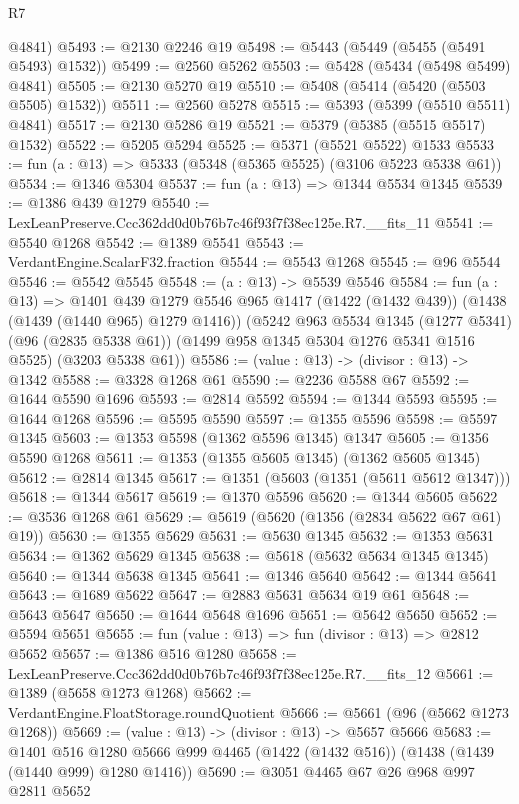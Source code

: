 \begin{lexlean}{R7}
\begin{coremodule}
      @4841)
@5493 := @2130 @2246 @19
@5498 := @5443 (@5449 (@5455 (@5491 @5493) @1532))
@5499 := @2560 @5262
@5503 := @5428 (@5434 (@5498 @5499) @4841)
@5505 := @2130 @5270 @19
@5510 := @5408 (@5414 (@5420 (@5503 @5505) @1532))
@5511 := @2560 @5278
@5515 := @5393 (@5399 (@5510 @5511) @4841)
@5517 := @2130 @5286 @19
@5521 := @5379 (@5385 (@5515 @5517) @1532)
@5522 := @5205 @5294
@5525 := @5371 (@5521 @5522) @1533
@5533 := fun (a : @13) => @5333 (@5348 (@5365 @5525) (@3106 @5223 @5338 @61))
@5534 := @1346 @5304
@5537 := fun (a : @13) => @1344 @5534 @1345
@5539 := @1386 @439 @1279
@5540 := LexLeanPreserve.Ccc362dd0d0b76b7c46f93f7f38ec125e.R7.__fits_11
@5541 := @5540 @1268
@5542 := @1389 @5541
@5543 := VerdantEngine.ScalarF32.fraction
@5544 := @5543 @1268
@5545 := @96 @5544
@5546 := @5542 @5545
@5548 := (a : @13) -> @5539 @5546
@5584 := fun (a : @13) =>
  @1401
    @439
    @1279
    @5546
    @965
    @1417
    (@1422 (@1432 @439))
    (@1438 (@1439 (@1440 @965) @1279 @1416))
    (@5242
      @963
      @5534
      @1345
      (@1277 @5341)
      (@96 (@2835 @5338 @61))
      (@1499 @958 @1345 @5304 @1276 @5341 @1516 @5525)
      (@3203 @5338 @61))
@5586 := (value : @13) -> (divisor : @13) -> @1342
@5588 := @3328 @1268 @61
@5590 := @2236 @5588 @67
@5592 := @1644 @5590 @1696
@5593 := @2814 @5592
@5594 := @1344 @5593
@5595 := @1644 @1268
@5596 := @5595 @5590
@5597 := @1355 @5596
@5598 := @5597 @1345
@5603 := @1353 @5598 (@1362 @5596 @1345) @1347
@5605 := @1356 @5590 @1268
@5611 := @1353 (@1355 @5605 @1345) (@1362 @5605 @1345)
@5612 := @2814 @1345
@5617 := @1351 (@5603 (@1351 (@5611 @5612 @1347)))
@5618 := @1344 @5617
@5619 := @1370 @5596
@5620 := @1344 @5605
@5622 := @3536 @1268 @61
@5629 := @5619 (@5620 (@1356 (@2834 @5622 @67 @61) @19))
@5630 := @1355 @5629
@5631 := @5630 @1345
@5632 := @1353 @5631
@5634 := @1362 @5629 @1345
@5638 := @5618 (@5632 @5634 @1345 @1345)
@5640 := @1344 @5638 @1345
@5641 := @1346 @5640
@5642 := @1344 @5641
@5643 := @1689 @5622
@5647 := @2883 @5631 @5634 @19 @61
@5648 := @5643 @5647
@5650 := @1644 @5648 @1696
@5651 := @5642 @5650
@5652 := @5594 @5651
@5655 := fun (value : @13) => fun (divisor : @13) => @2812 @5652
@5657 := @1386 @516 @1280
@5658 := LexLeanPreserve.Ccc362dd0d0b76b7c46f93f7f38ec125e.R7.__fits_12
@5661 := @1389 (@5658 @1273 @1268)
@5662 := VerdantEngine.FloatStorage.roundQuotient
@5666 := @5661 (@96 (@5662 @1273 @1268))
@5669 := (value : @13) -> (divisor : @13) -> @5657 @5666
@5683 := @1401
    @516
    @1280
    @5666
    @999
    @4465
    (@1422 (@1432 @516))
    (@1438 (@1439 (@1440 @999) @1280 @1416))
@5690 := @3051 @4465 @67 @26 @968 @997 @2811 @5652

\end{coremodule}
\end{lexlean}
